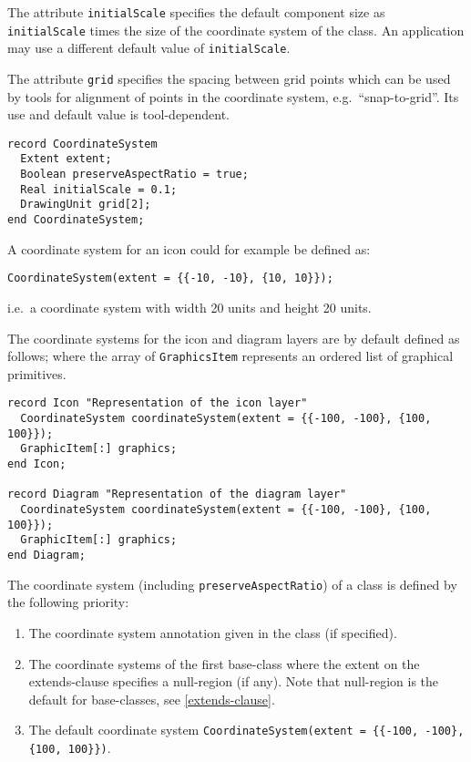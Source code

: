 The attribute \lstinline!initialScale! specifies the default component size as
\lstinline!initialScale! times the size of the coordinate system of the class. An
application may use a different default value of \lstinline!initialScale!.

The attribute \lstinline!grid! specifies the spacing between grid points which can
be used by tools for alignment of points in the coordinate system, e.g.\ ``snap-to-grid''.
Its use and default value is tool-dependent.

\begin{lstlisting}[language=modelica]
record CoordinateSystem
  Extent extent;
  Boolean preserveAspectRatio = true;
  Real initialScale = 0.1;
  DrawingUnit grid[2];
end CoordinateSystem;
\end{lstlisting}

\begin{example}
A coordinate system for an icon could for example be defined as:
\begin{lstlisting}[language=modelica]
CoordinateSystem(extent = {{-10, -10}, {10, 10}});
\end{lstlisting}
i.e.\ a coordinate system with width 20 units and height 20 units.
\end{example}

The coordinate systems for the icon and diagram layers are by default
defined as follows; where the array of \lstinline!GraphicsItem! represents an
ordered list of graphical primitives.

\begin{lstlisting}[language=modelica]
record Icon "Representation of the icon layer"
  CoordinateSystem coordinateSystem(extent = {{-100, -100}, {100, 100}});
  GraphicItem[:] graphics;
end Icon;

record Diagram "Representation of the diagram layer"
  CoordinateSystem coordinateSystem(extent = {{-100, -100}, {100, 100}});
  GraphicItem[:] graphics;
end Diagram;
\end{lstlisting}
The coordinate system (including \lstinline!preserveAspectRatio!) of a class is defined by the following priority:
\begin{enumerate}
\item
  The coordinate system annotation given in the class (if specified).
\item
  The coordinate systems of the first base-class where the extent on the
  extends-clause specifies a null-region (if any). Note that null-region
  is the default for base-classes, see \cref{extends-clause}.
\item
  The default coordinate system \lstinline!CoordinateSystem(extent = {{-100, -100}, {100, 100}})!.
\end{enumerate}

